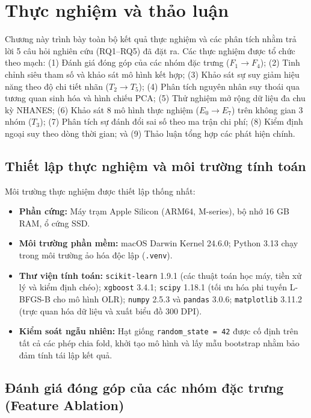 \chapter{Thực nghiệm và thảo luận}
\label{ch:thuc-nghiem}

Chương này trình bày toàn bộ kết quả thực nghiệm và các phân tích nhằm trả lời 5 câu hỏi nghiên cứu (RQ1--RQ5) đã đặt ra. Các thực nghiệm được tổ chức theo mạch: (1) Đánh giá đóng góp của các nhóm đặc trưng ($F_1 \to F_4$); (2) Tinh chỉnh siêu tham số và khảo sát mô hình kết hợp; (3) Khảo sát sự suy giảm hiệu năng theo độ chi tiết nhãn ($T_2 \to T_5$); (4) Phân tích nguyên nhân suy thoái qua tương quan sinh hóa và hình chiếu PCA; (5) Thử nghiệm mở rộng dữ liệu đa chu kỳ NHANES; (6) Khảo sát 8 mô hình thực nghiệm ($E_0 \to E_7$) trên không gian 3 nhóm ($T_3$); (7) Phân tích sự đánh đổi sai số theo ma trận chi phí; (8) Kiểm định ngoại suy theo dòng thời gian; và (9) Thảo luận tổng hợp các phát hiện chính.

\section{Thiết lập thực nghiệm và môi trường tính toán}
\label{sec:moi-truong-thuc-nghiem}

Môi trường thực nghiệm được thiết lập thống nhất:
\begin{itemize}
    \item \textbf{Phần cứng:} Máy trạm Apple Silicon (ARM64, M-series), bộ nhớ 16 GB RAM, ổ cứng SSD.
    \item \textbf{Môi trường phần mềm:} macOS Darwin Kernel 24.6.0; Python 3.13 chạy trong môi trường ảo hóa độc lập (\texttt{.venv}).
    \item \textbf{Thư viện tính toán:} \texttt{scikit-learn} 1.9.1 (các thuật toán học máy, tiền xử lý và kiểm định chéo); \texttt{xgboost} 3.4.1; \texttt{scipy} 1.18.1 (tối ưu hóa phi tuyến L-BFGS-B cho mô hình OLR); \texttt{numpy} 2.5.3 và \texttt{pandas} 3.0.6; \texttt{matplotlib} 3.11.2 (trực quan hóa dữ liệu và xuất biểu đồ 300 DPI).
    \item \textbf{Kiểm soát ngẫu nhiên:} Hạt giống \texttt{random\_state = 42} được cố định trên tất cả các phép chia fold, khởi tạo mô hình và lấy mẫu bootstrap nhằm bảo đảm tính tái lập kết quả.
\end{itemize}

\section{Đánh giá đóng góp của các nhóm đặc trưng (Feature Ablation)}
\label{sec:feature-ablation}

